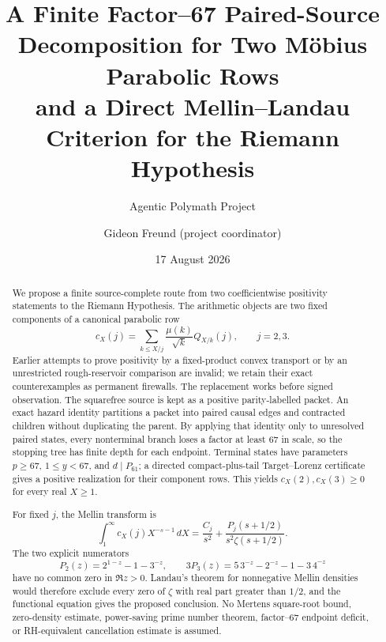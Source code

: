 \documentclass[11pt]{article}
\title{\bfseries A Finite Factor--67 Paired-Source Decomposition for Two M\"obius Parabolic Rows\\[2mm]
\large and a Direct Mellin--Landau Criterion for the Riemann Hypothesis}
\author[1]{Agentic Polymath Project}
\author[2]{Gideon Freund (project coordinator)}
\affil[1]{Open collaborative mathematical research programme}
\affil[2]{Gettysburg Research / Riemann repository}
\date{17 August 2026}
\begin{document}
\maketitle

\begin{center}
\end{center}

\begin{abstract}
We propose a finite source-complete route from two coefficientwise positivity statements to the Riemann Hypothesis.  The arithmetic objects are two fixed components of a canonical parabolic row
\[
 c_X(j)=\sum_{k\le X/j}\frac{\mu(k)}{\sqrt{k}}Q_{X/k}(j),\qquad j=2,3.
\]
Earlier attempts to prove positivity by a fixed-product convex transport or by an unrestricted rough-reservoir comparison are invalid; we retain their exact counterexamples as permanent firewalls.  The replacement works before signed observation.  The squarefree source is kept as a positive parity-labelled packet.  An exact hazard identity partitions a packet into paired causal edges and contracted children without duplicating the parent.  By applying that identity only to unresolved paired states, every nonterminal branch loses a factor at least $67$ in scale, so the stopping tree has finite depth for each endpoint.  Terminal states have parameters $p\ge67$, $1\le y<67$, and $d\mid P_{61}$; a directed compact-plus-tail Target--Lorenz certificate gives a positive realization for their component rows.  This yields $c_X(2),c_X(3)\ge0$ for every real $X\ge1$.

For fixed $j$, the Mellin transform is
\[
 \int_1^\infty c_X(j)X^{-s-1}\,dX
 =\frac{C_j}{s^2}+\frac{P_j(s+1/2)}{s^2\zeta(s+1/2)}.
\]
The two explicit numerators
\[
 P_2(z)=2^{1-z}-1-3^{-z},\qquad
 3P_3(z)=5\,3^{-z}-2^{-z}-1-3\,4^{-z}
\]
have no common zero in $\Re z>0$.  Landau's theorem for nonnegative Mellin densities would therefore exclude every zero of $\zeta$ with real part greater than $1/2$, and the functional equation gives the proposed conclusion.  No Mertens square-root bound, zero-density estimate, power-saving prime number theorem, factor--67 endpoint deficit, or RH-equivalent cancellation estimate is assumed.
\end{abstract}
\end{document}
